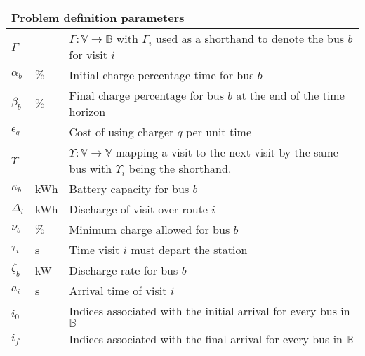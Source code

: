 \documentclass[utf8]{FrontiersinHarvard}
\begin{document}
\begin{table}[!htpb]
\begin{tabularx}{\textwidth}{l l l}
    \hline \multicolumn{3}{l}{Problem definition parameters}                                                                                \\
    \hline $\Gamma$    &       & $\Gamma: \mathbb{V} \rightarrow \mathbb{B}$ with $\Gamma_i$ used as a shorthand to denote the bus $b$ for visit $i$                 \\
    $\alpha_b$         & $\%$  & Initial charge percentage time for bus $b$                                                                      \\
    $\beta_b$         & $\%$  & Final charge percentage for bus $b$ at the end of the time horizon                                              \\
    $\epsilon_q$         &       & Cost of using charger $q$ per unit time                                                                         \\
    $\Upsilon$           &       & $\Upsilon: \mathbb{V} \rightarrow \mathbb{V}$ mapping a visit to the next visit by the same bus with $\Upsilon_i$ being the shorthand.  \\
    $\kappa_b$         & kWh   & Battery capacity for bus $b$                                                                                    \\
    $\Delta_i$         & kWh   & Discharge of visit over route $i$                                                                               \\
    $\nu_b$         & $\%$  & Minimum charge allowed for bus $b$                                                                              \\
    $\tau_i$         & s     & Time visit $i$ must depart the station                                                                          \\
    $\zeta_b$         & kW    & Discharge rate for bus $b$                                                                                      \\
    $a_i$         & s     & Arrival time of visit $i$                                                                                       \\
    $i_0$         &       & Indices associated with the initial arrival
    for every bus in $\mathbb{B}$                                                                                                           \\
    $i_f$         &       & Indices associated with the final arrival for every bus in $\mathbb{B}$                                         \\

\end{tabularx}
\end{table}
\end{document}
